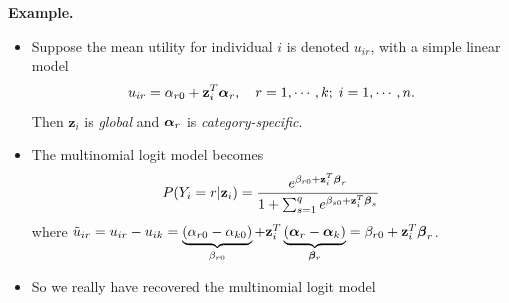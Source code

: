 \documentclass{beamer}
\begin{document}
\begin{frame}{}
\textbf{Example.}
\begin{itemize}
\item
Suppose the mean utility for individual $i$ is denoted $u_{ir}$, with a simple linear model
$$u_{ir}=\alpha_{r0}+\textbf{z}_i^T\mbox{\boldmath $\alpha$}_r, \quad r=1,\cdots, k; \; i=1,\cdots,n.$$
Then $\textbf{z}_i$ is \emph{global} and $\mbox{\boldmath $\alpha$}_r$ is \emph{category-specific}.
\item
The multinomial logit model becomes
$$P(Y_i=r|\textbf{z}_i)=\frac{e^{\beta_{r0}+\textbf{z}_i^T\mbox{\scriptsize \boldmath $\beta$}_r}}{1+
\sum_{s=1}^q e^{\beta_{s0}+\textbf{z}_i^T\mbox{\scriptsize \boldmath $\beta$}_s}}$$
where $\tilde{u}_{ir}=u_{ir}-u_{ik}
=\underbrace{(\alpha_{r0}-\alpha_{k0})}_{\beta_{r0}}+\textbf{z}_i^T \underbrace{(\mbox{\boldmath $\alpha$}_r-\mbox{\boldmath $\alpha$}_k)}_{\boldsymbol \beta_r} = \beta_{r0}+\textbf{z}_i^T\mbox{\boldmath $\beta$}_r$.

\item So we really have recovered the multinomial logit model
\end{itemize}
\end{frame}
\end{document}

